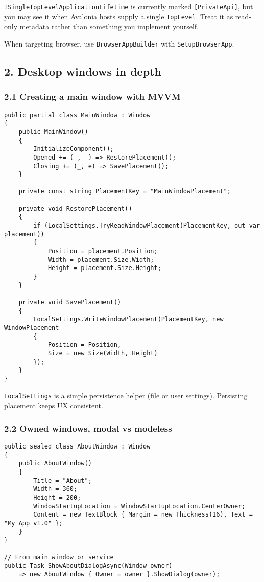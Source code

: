 \passthrough{\lstinline!ISingleTopLevelApplicationLifetime!} is
currently marked \passthrough{\lstinline![PrivateApi]!}, but you may see
it when Avalonia hosts supply a single
\passthrough{\lstinline!TopLevel!}. Treat it as read-only metadata
rather than something you implement yourself.

When targeting browser, use \passthrough{\lstinline!BrowserAppBuilder!}
with \passthrough{\lstinline!SetupBrowserApp!}.

\subsection{2. Desktop windows in depth}\label{desktop-windows-in-depth}

\subsubsection{2.1 Creating a main window with
MVVM}\label{creating-a-main-window-with-mvvm}

\begin{lstlisting}
public partial class MainWindow : Window
{
    public MainWindow()
    {
        InitializeComponent();
        Opened += (_, _) => RestorePlacement();
        Closing += (_, e) => SavePlacement();
    }

    private const string PlacementKey = "MainWindowPlacement";

    private void RestorePlacement()
    {
        if (LocalSettings.TryReadWindowPlacement(PlacementKey, out var placement))
        {
            Position = placement.Position;
            Width = placement.Size.Width;
            Height = placement.Size.Height;
        }
    }

    private void SavePlacement()
    {
        LocalSettings.WriteWindowPlacement(PlacementKey, new WindowPlacement
        {
            Position = Position,
            Size = new Size(Width, Height)
        });
    }
}
\end{lstlisting}

\passthrough{\lstinline!LocalSettings!} is a simple persistence helper
(file or user settings). Persisting placement keeps UX consistent.

\subsubsection{2.2 Owned windows, modal vs
modeless}\label{owned-windows-modal-vs-modeless}

\begin{lstlisting}
public sealed class AboutWindow : Window
{
    public AboutWindow()
    {
        Title = "About";
        Width = 360;
        Height = 200;
        WindowStartupLocation = WindowStartupLocation.CenterOwner;
        Content = new TextBlock { Margin = new Thickness(16), Text = "My App v1.0" };
    }
}

// From main window or service
public Task ShowAboutDialogAsync(Window owner)
    => new AboutWindow { Owner = owner }.ShowDialog(owner);
\end{lstlisting}

